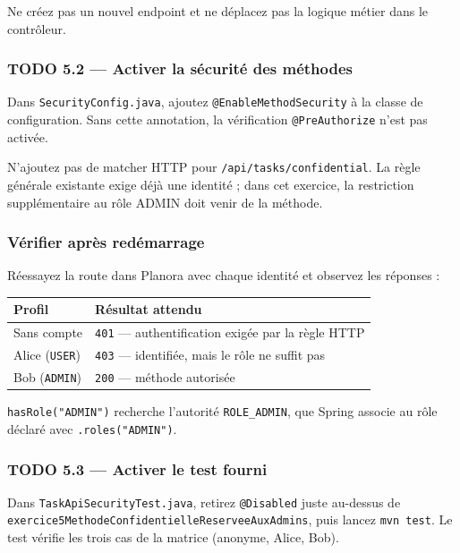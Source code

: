 \documentclass[
  french,
  10pt,
  a4paper,
]{article}
\newcounter{none} %
\begin{document}
Ne créez pas un nouvel endpoint et ne déplacez pas la logique métier
dans le contrôleur.

\subsubsection{TODO 5.2 --- Activer la sécurité des
méthodes}\label{todo-5.2-activer-la-suxe9curituxe9-des-muxe9thodes}

Dans \texttt{SecurityConfig.java}, ajoutez
\texttt{@EnableMethodSecurity} à la classe de configuration. Sans cette
annotation, la vérification \texttt{@PreAuthorize} n'est pas activée.

N'ajoutez pas de matcher HTTP pour \texttt{/api/tasks/confidential}. La
règle générale existante exige déjà une identité ; dans cet exercice, la
restriction supplémentaire au rôle ADMIN doit venir de la méthode.

\subsubsection{Vérifier après
redémarrage}\label{vuxe9rifier-apruxe8s-reduxe9marrage}

Réessayez la route dans Planora avec chaque identité et observez les
réponses :

{\def\LTcaptype{none} %
\begin{longtable}[]{@{}ll@{}}
\toprule\noalign{}
Profil & Résultat attendu \\
\midrule\noalign{}
\endhead
\bottomrule\noalign{}
\endlastfoot
Sans compte & \texttt{401} --- authentification exigée par la règle
HTTP \\
Alice (\texttt{USER}) & \texttt{403} --- identifiée, mais le rôle ne
suffit pas \\
Bob (\texttt{ADMIN}) & \texttt{200} --- méthode autorisée \\
\end{longtable}
}

\texttt{hasRole("ADMIN")} recherche l'autorité \texttt{ROLE\_ADMIN}, que
Spring associe au rôle déclaré avec \texttt{.roles("ADMIN")}.

\subsubsection{TODO 5.3 --- Activer le test
fourni}\label{todo-5.3-activer-le-test-fourni}

Dans \texttt{TaskApiSecurityTest.java}, retirez \texttt{@Disabled} juste
au-dessus de \texttt{exercice5MethodeConfidentielleReserveeAuxAdmins},
puis lancez \texttt{mvn\ test}. Le test vérifie les trois cas de la
matrice (anonyme, Alice, Bob).
\end{document}
